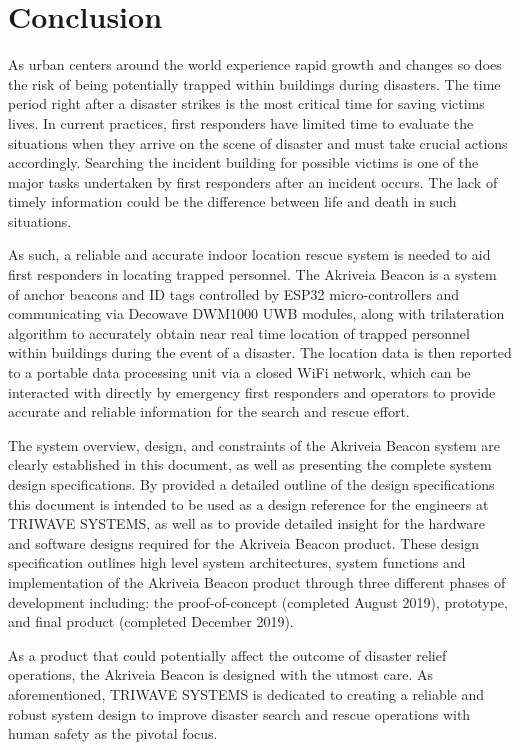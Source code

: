 

\setcounter{section}{6}
\section{Conclusion}

\bigskip
As urban centers around the world experience rapid growth and changes so does the risk of being potentially trapped within buildings during disasters. The time period right after a disaster strikes is the most critical time for saving victims lives. In current practices, first responders have limited time to evaluate the situations when they arrive on the scene of disaster and must take crucial actions accordingly. Searching the incident building for possible victims is one of the major tasks undertaken by first responders after an incident occurs. The lack of timely information could be the difference between life and death in such situations.

\bigskip
As such, a reliable and accurate indoor location rescue system is needed to aid first responders in locating trapped personnel. The Akriveia Beacon is a system of anchor beacons and ID tags controlled by ESP32 micro-controllers and communicating via Decowave DWM1000 UWB modules, along with trilateration algorithm to accurately obtain near real time location of trapped personnel within buildings during the event of a disaster. The location data is then reported to a portable data processing unit via a closed WiFi network, which can be interacted with directly by emergency first responders and operators to provide accurate and reliable information for the search and rescue effort. 

\bigskip
The system overview, design, and constraints of the Akriveia Beacon system are clearly established in this document, as well as presenting the complete system design specifications. By provided a detailed outline of the design specifications this document is intended to be used as a design reference for the engineers at TRIWAVE SYSTEMS, as well as to provide detailed insight for the hardware and software designs required for the Akriveia Beacon product. These design specification outlines high level system architectures, system functions and implementation of the Akriveia Beacon product through three different phases of development including: the proof-of-concept (completed August 2019), prototype, and final product (completed December 2019).

\bigskip
As a product that could potentially affect the outcome of disaster relief operations, the Akriveia Beacon is designed with the utmost care. As aforementioned, TRIWAVE SYSTEMS is dedicated to creating a reliable and robust system design to improve disaster search and rescue operations with human safety as the pivotal focus.

